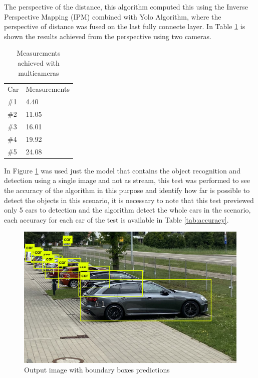The perspective of the distance, this algorithm computed this using the Inverse Perspective Mapping (IPM) combined with Yolo Algorithm, where the perspective of distance was fused on the last fully connecte layer. In Table \ref{tab:output_framework} is shown the results achieved from the perspective using two cameras. 

\begin{table}[H]
\centering
\caption{Measurements achieved with multicameras}
\begin{tabular}{l|l} 
\toprule
Car &  Measurements      \\
\#1   & 4.40        \\
\#2   & 11.05       \\
\#3   & 16.01       \\
\#4   & 19.92       \\
\#5   & 24.08       \\
\bottomrule
\end{tabular}
\label{tab:output_framework}
\end{table} 
 

In Figure \ref{fig:park_predict} was used just the model that contains the object recognition and detection using a single image and not as stream, this test was performed to see the accuracy of the algorithm in this purpose and identify how far is possible to detect the objects in this scenario, it is necessary to note that this test previewed only 5 cars to detection and the algorithm detect the whole cars in the scenario, each accuracy for each car of the test is available in Table \ref{tab:accuracy}.


\begin{figure}[H]
\centering
\includegraphics[scale=0.3]{imagens/predictions.jpg}
\caption{Output image with boundary boxes predictions}
\label{fig:park_predict}
\end{figure}



